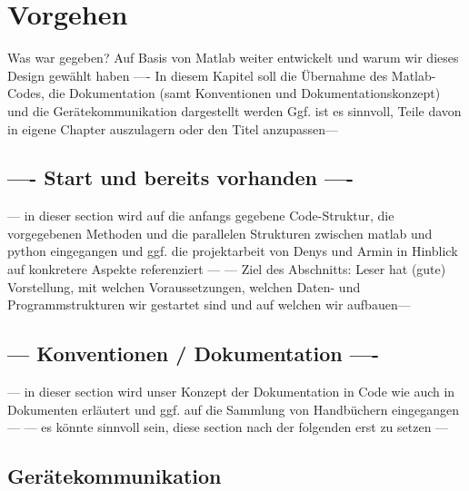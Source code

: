 \documentclass[../Report.tex]{subfiles}
\begin{document}
\chapter{Vorgehen}
\label{chap:vorgehen}
Was war gegeben? Auf Basis von Matlab weiter entwickelt und warum wir dieses Design gewählt haben
---- In diesem Kapitel soll die Übernahme des Matlab-Codes, die Dokumentation (samt Konventionen und Dokumentationskonzept) und die Gerätekommunikation dargestellt werden 
Ggf. ist es sinnvoll, Teile davon in eigene Chapter auszulagern oder den Titel anzupassen--- 

\section[---setup ---]{---- Start und bereits vorhanden  ----}
\label{sec:vorg.setup}
--- in dieser section wird auf die anfangs gegebene Code-Struktur, die vorgegebenen Methoden und die parallelen Strukturen zwischen matlab und python eingegangen und ggf. die projektarbeit von Denys und Armin in Hinblick auf konkretere Aspekte referenziert ---
--- Ziel des Abschnitts: Leser hat (gute) Vorstellung, mit welchen Voraussetzungen, welchen Daten- und Programmstrukturen wir gestartet sind und auf welchen wir aufbauen---


\section{ --- Konventionen / Dokumentation ---- }
\label{sec:vorg.doku}
--- in dieser section wird unser Konzept der Dokumentation in Code wie auch in Dokumenten erläutert und ggf. auf die Sammlung von Handbüchern eingegangen --- 
--- es könnte sinnvoll sein, diese section nach der folgenden erst zu setzen --- 

\section{Gerätekommunikation}
\label{sec:vorg.geraete}
\end{document}
